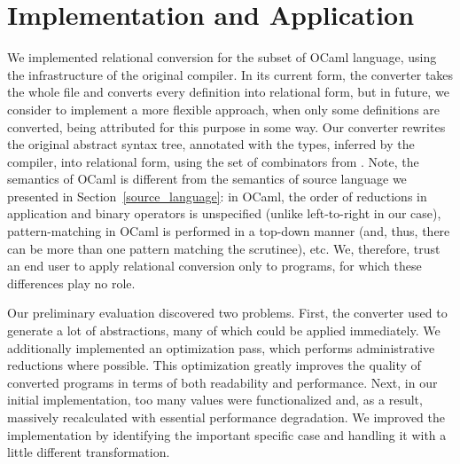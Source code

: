 \section{Implementation and Application}
\label{evaluation}

We implemented relational conversion for the subset of OCaml language, using the infrastructure of the 
original compiler. In its current form, the converter takes the whole file and converts every definition into relational form, 
but in future, we consider to implement a more flexible approach, when only some definitions are converted, being attributed
for this purpose in some way. Our converter rewrites the original abstract syntax tree, annotated with the types, inferred by the compiler, 
into relational form, using the set of combinators from \ocanren. Note, the semantics of OCaml is different from the 
semantics of source language we presented in Section~\ref{source_language}: in OCaml, the order of reductions in
application and binary operators is unspecified (unlike left-to-right in our case), pattern-matching in
OCaml is performed in a top-down manner (and, thus, there can be more than one pattern matching the scrutinee), etc. We, therefore, trust an end user to apply relational conversion only to programs, for which these differences play
no role.

Our preliminary evaluation discovered two problems. First, the converter used to generate a lot of abstractions, 
many of which could be applied immediately. We additionally implemented an optimization pass, which performs 
administrative reductions where possible. This optimization greatly improves the quality of converted 
programs in terms of both readability and performance. Next, in our initial implementation, too many values were
functionalized and, as a result, massively recalculated with essential performance degradation. We improved
the implementation by identifying the important specific case and handling it with a little different 
transformation.

